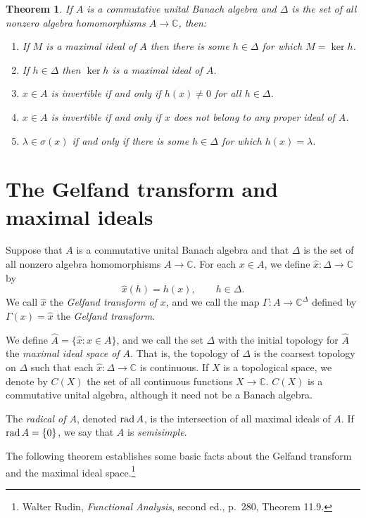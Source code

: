 \documentclass{article}
\newcommand{\rad}{\ensuremath\mathrm{rad}\,}
\newtheorem{theorem}{Theorem}
\theoremstyle{definition}
\begin{document}
\begin{theorem}
If $A$ is a commutative unital Banach algebra and $\Delta$ is the set of all nonzero
algebra homomorphisms $A \to \mathbb{C}$, then:
\begin{enumerate}
\item If $M$ is a maximal ideal of $A$ then there is some $h \in \Delta$ for which $M=\ker h$.
\item If $h \in \Delta$ then $\ker h$ is a maximal ideal of $A$.
\item $x \in A$ is invertible if and only if  $h(x) \neq 0$ for all $h \in \Delta$.
\item $x \in A$ is invertible if and only if $x$ does not belong to any proper ideal of $A$.
\item  $\lambda \in \sigma(x)$ if and only if there is some $h \in \Delta$ for which $h(x)=\lambda$.
\end{enumerate}
\label{homotheorem}
\end{theorem} 



\section{The Gelfand transform and maximal ideals}
Suppose that $A$ is a commutative unital Banach algebra and that $\Delta$ is the set of all nonzero algebra homomorphisms $A \to \mathbb{C}$. 
For each $x \in A$, we define $\hat{x}:\Delta \to \mathbb{C}$ by
\[
\hat{x}(h)=h(x), \qquad h \in \Delta.
\]
We call $\hat{x}$ the {\em Gelfand transform of $x$}, and
we call the map $\Gamma:A \to \mathbb{C}^\Delta$ defined by $\Gamma(x) = \hat{x}$ the {\em Gelfand transform}.


We define $\widehat{A}=\{\hat{x}:x \in A\}$, and we call the set $\Delta$ with the initial topology for $\widehat{A}$ the {\em maximal ideal space of $A$}. That is,
the topology of $\Delta$ is the coarsest topology on $\Delta$ such that each $\hat{x}:\Delta \to \mathbb{C}$ is continuous. 
If $X$ is a topological space, we denote by $C(X)$ the set of all continuous functions $X \to \mathbb{C}$. $C(X)$ is a commutative unital algebra, although it need not be a Banach algebra.

The {\em radical of $A$}, denoted $\rad A$, is the intersection of all maximal ideals of $A$. If $\rad A= \{0\}$, we say that $A$ is {\em semisimple}.


The following theorem establishes some basic facts about the Gelfand transform and the maximal ideal space.\footnote{Walter
Rudin, {\em Functional Analysis}, second ed., p.~280, Theorem 11.9.}
\end{document}
